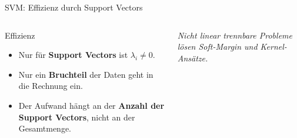 \begin{frame}{SVM: Effizienz durch Support Vectors}
\begin{columns}

\centering


\footnotesize
\begin{blockC1}{Effizienz}
\begin{itemize}
  \item Nur für \textbf{Support Vectors} ist $\lambda_i \neq 0$.
  \item Nur ein \textbf{Bruchteil} der Daten geht in die Rechnung ein.
  \item Der Aufwand hängt an der \textbf{Anzahl der Support Vectors}, nicht
        an der Gesamtmenge.
\end{itemize}
\end{blockC1}

\vspace{0.3em}
{\footnotesize\itshape Nicht linear trennbare Probleme lösen Soft-Margin
und Kernel-Ansätze.}
\end{columns}

\end{frame}


